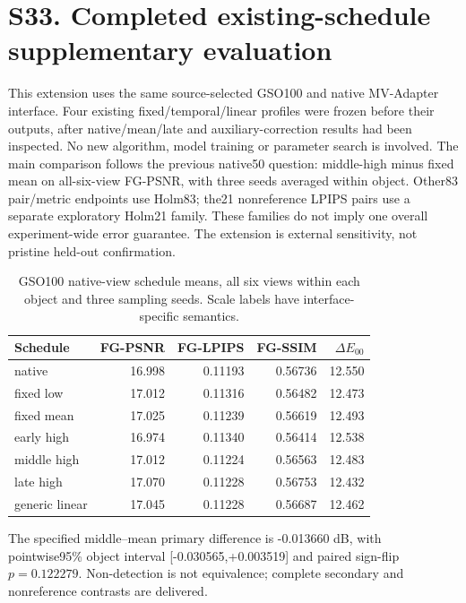 \section*{S33. Completed existing-schedule supplementary evaluation}
This extension uses the same source-selected GSO100 and native MV-Adapter interface. Four existing fixed/temporal/linear profiles were frozen before their outputs, after native/mean/late and auxiliary-correction results had been inspected. No new algorithm, model training or parameter search is involved. The main comparison follows the previous native50 question: middle-high minus fixed mean on all-six-view FG-PSNR, with three seeds averaged within object. Other83 pair/metric endpoints use Holm83; the21 nonreference LPIPS pairs use a separate exploratory Holm21 family. These families do not imply one overall experiment-wide error guarantee. The extension is external sensitivity, not pristine held-out confirmation.
\begin{table}[ht]\centering\small\begin{tabular}{lrrrr}\toprule Schedule & FG-PSNR & FG-LPIPS & FG-SSIM & $\Delta E_{00}$ \\\midrule
native & 16.998 & 0.11193 & 0.56736 & 12.550 \\
fixed low & 17.012 & 0.11316 & 0.56482 & 12.473 \\
fixed mean & 17.025 & 0.11239 & 0.56619 & 12.493 \\
early high & 16.974 & 0.11340 & 0.56414 & 12.538 \\
middle high & 17.012 & 0.11224 & 0.56563 & 12.483 \\
late high & 17.070 & 0.11228 & 0.56753 & 12.432 \\
generic linear & 17.045 & 0.11228 & 0.56687 & 12.462 \\
\bottomrule\end{tabular}\caption{GSO100 native-view schedule means, all six views within each object and three sampling seeds. Scale labels have interface-specific semantics.}\end{table}
The specified middle--mean primary difference is -0.013660 dB, with pointwise95\% object interval [-0.030565,+0.003519] and paired sign-flip $p=0.122279$. Non-detection is not equivalence; complete secondary and nonreference contrasts are delivered.
